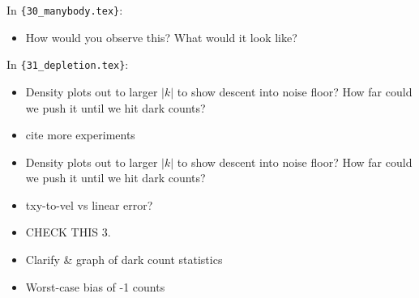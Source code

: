 In \verb|{30_manybody.tex}|:
\begin{itemize}
\item {How would you observe this?  What would it look like?}
\end{itemize}
In \verb|{31_depletion.tex}|:
\begin{itemize}
\item {Density plots out to larger $|k|$ to show descent into noise floor? How far could we push it until we hit dark counts?}
\item {cite more experiments}
\item {Density plots out to larger $|k|$ to show descent into noise floor? How far could we push it until we hit dark counts?}
\item {txy-to-vel vs linear error?}
\item {CHECK THIS 3.}
\item {Clarify \& graph of dark count statistics}
\item {Worst-case bias of -1 counts}
\end{itemize}
